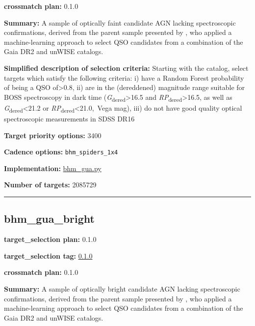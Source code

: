 \noindent\textbf{crossmatch plan:} 0.1.0

\noindent\textbf{Summary:} A sample of optically faint candidate AGN lacking
spectroscopic confirmations, derived from the parent sample presented by
\citet{Shu2019}, who applied a machine-learning approach to select QSO
candidates from a combination of the Gaia DR2 and unWISE catalogs.

\noindent\textbf{Simplified description of selection criteria:} Starting with the
\citet{Shu2019} catalog, select targets which satisfy the following
criteria: i) have a Random Forest probability of being a QSO
of\textgreater0.8, ii) are in the (dereddened) magnitude range suitable
for BOSS spectroscopy in dark time
(\emph{G}\textsubscript{dered}\textgreater16.5 and
\emph{RP}\textsubscript{dered}\textgreater16.5, as well as
\emph{G}\textsubscript{dered}\textless21.2 or
\emph{RP}\textsubscript{dered}\textless21.0,~Vega mag), iii) do not have
good quality optical spectroscopic measurements in SDSS DR16


\noindent\textbf{Target priority options:} 3400

\noindent\textbf{Cadence options:} \texttt{bhm\_spiders\_1x4}

\noindent\textbf{Implementation:}
\href{https://github.com/sdss/target_selection/blob/0.1.0/python/target_selection/cartons/bhm_gua.py}{bhm\_gua.py}

\noindent\textbf{Number of targets:} 2085729

\begin{center}\rule{0.5\linewidth}{0.5pt}\end{center}

\hypertarget{bhm_gua_bright_plan0.1.0}{%
\subsection{bhm\_gua\_bright}\label{bhm_gua_bright_plan0.1.0}}

\noindent\textbf{target\_selection plan:} 0.1.0

\noindent\textbf{target\_selection tag:}
\href{https://github.com/sdss/target_selection/tree/0.1.0/}{0.1.0}

\noindent\textbf{crossmatch plan:} 0.1.0

\noindent\textbf{Summary:} A sample of optically bright candidate AGN lacking
spectroscopic confirmations, derived from the parent sample presented by
\citet{Shu2019}, who applied a machine-learning approach to select QSO
candidates from a combination of the Gaia DR2 and unWISE catalogs.

